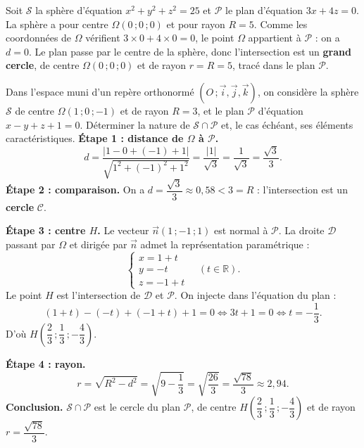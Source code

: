 \documentclass[11pt]{article}
\newcounter{popsec}
\newcounter{popsub}
\newcommand{\courssub}[1]{%
  \stepcounter{popsub}%
  \par\vspace{9pt}\noindent{\popxbold\fontsize{11.5}{13}\selectfont\color{popink}{\color{poporange}\thepopsec.\thepopsub}\hspace{6pt}#1}\par\nopagebreak\vspace{4pt}
}
\begin{document}
\courssub{Exemples résolus}

\begin{exemplebox}[Sphère centrée à l'origine et plan $3x + 4z = 0$]
Soit $\mathcal{S}$ la sphère d'équation $x^{2} + y^{2} + z^{2} = 25$ et $\mathcal{P}$ le plan d'équation $3x + 4z = 0$. La sphère a pour centre $\Omega(0\,; 0\,; 0)$ et pour rayon $R = 5$. Comme les coordonnées de $\Omega$ vérifient $3 \times 0 + 4 \times 0 = 0$, le point $\Omega$ appartient à $\mathcal{P}$ : on a $d = 0$. Le plan passe par le centre de la sphère, donc l'intersection est un \textbf{grand cercle}, de centre $\Omega(0\,;0\,;0)$ et de rayon $r = R = 5$, tracé dans le plan $\mathcal{P}$.
\end{exemplebox}

\begin{exoresolu}
Dans l'espace muni d'un repère orthonormé $(O\,; \vec{i}, \vec{j}, \vec{k})$, on considère la sphère $\mathcal{S}$ de centre $\Omega(1\,; 0\,; -1)$ et de rayon $R = 3$, et le plan $\mathcal{P}$ d'équation $x - y + z + 1 = 0$. Déterminer la nature de $\mathcal{S} \cap \mathcal{P}$ et, le cas échéant, ses éléments caractéristiques.
\tcblower
\textbf{Étape 1 : distance de $\Omega$ à $\mathcal{P}$.}
\[ d = \dfrac{|1 - 0 + (-1) + 1|}{\sqrt{1^{2} + (-1)^{2} + 1^{2}}} = \dfrac{|1|}{\sqrt{3}} = \dfrac{1}{\sqrt{3}} = \dfrac{\sqrt{3}}{3}. \]
\textbf{Étape 2 : comparaison.} On a $d = \dfrac{\sqrt{3}}{3} \approx 0{,}58 < 3 = R$ : l'intersection est un \textbf{cercle} $\mathcal{C}$.

\textbf{Étape 3 : centre $H$.} Le vecteur $\vec{n}(1\,; -1\,; 1)$ est normal à $\mathcal{P}$. La droite $\mathcal{D}$ passant par $\Omega$ et dirigée par $\vec{n}$ admet la représentation paramétrique :
\[ \begin{cases} x = 1 + t \\ y = -t \\ z = -1 + t \end{cases} \quad (t \in \mathbb{R}). \]
Le point $H$ est l'intersection de $\mathcal{D}$ et $\mathcal{P}$. On injecte dans l'équation du plan :
\[ (1 + t) - (-t) + (-1 + t) + 1 = 0 \iff 3t + 1 = 0 \iff t = -\dfrac{1}{3}. \]
D'où $H\left(\dfrac{2}{3}\,; \dfrac{1}{3}\,; -\dfrac{4}{3}\right)$.

\textbf{Étape 4 : rayon.}
\[ r = \sqrt{R^{2} - d^{2}} = \sqrt{9 - \dfrac{1}{3}} = \sqrt{\dfrac{26}{3}} = \dfrac{\sqrt{78}}{3} \approx 2{,}94. \]
\textbf{Conclusion.} $\mathcal{S} \cap \mathcal{P}$ est le cercle du plan $\mathcal{P}$, de centre $H\left(\dfrac{2}{3}\,; \dfrac{1}{3}\,; -\dfrac{4}{3}\right)$ et de rayon $r = \dfrac{\sqrt{78}}{3}$.
\end{exoresolu}
\end{document}

